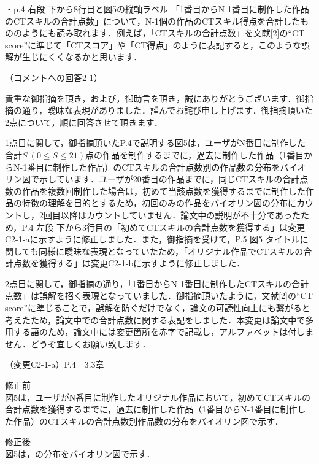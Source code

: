\documentclass{jarticle} %
\def\subsection#1{ \vspace{1pc} {\gt #1} }
\begin{document}
\vspace{0.2cm}
\noindent・p.4 右段 下から8行目と図5の縦軸ラベル 「1番目からN-1番目に制作した作品のCTスキルの合計点数」について，N-1個の作品のCTスキル得点を合計したもののようにも読み取れます．例えば，「CTスキルの合計点数」を文献[2]の``CT score''に準じて「CTスコア」や「CT得点」のように表記すると，このような誤解が生じにくくなるかと思います．

\subsection{（コメントへの回答2-1）}

貴重な御指摘を頂き，および，御助言を頂き，誠にありがとうございます．御指摘の通り，曖昧な表現がありました．謹んでお詫び申し上げます．御指摘頂いた2点について，順に回答させて頂きます．

1点目に関して，御指摘頂いたP.4で説明する図5は，ユーザがN番目に制作した合計{$S~(0 \leq S \leq 21)$}点の作品を制作するまでに，過去に制作した作品（1番目からN-1番目に制作した作品）のCTスキルの合計点数別の作品数の分布をバイオリン図で示しています．ユーザが20番目の作品までに，同じCTスキルの合計点数の作品を複数回制作した場合は，初めて当該点数を獲得するまでに制作した作品の特徴の理解を目的とするため，初回のみの作品をバイオリン図の分布にカウントし，2回目以降はカウントしていません．論文中の説明が不十分であったため，P.4 左段 下から3行目の「初めてCTスキルの合計点数を獲得する」は変更C2-1-aに示すように修正しました．また，御指摘を受けて，P.5 図5 タイトルに関しても同様に曖昧な表現となっていたため，「オリジナル作品でCTスキルの合計点数を獲得する」は変更C2-1-bに示すように修正しました．

2点目に関して，御指摘の通り，「1番目からN-1番目に制作したCTスキルの合計点数」は誤解を招く表現となっていました．御指摘頂いたように，文献[2]の``CT score''に準じることで，誤解を防ぐだけでなく，論文の可読性向上にも繋がると考えたため，論文中での合計点数に関する表記をしました．本変更は論文中で多用する語のため，論文中には変更箇所を赤字で記載し，アルファベットは付しません．どうぞ宜しくお願い致します．


\subsection{（変更C2-1-a）P.4　3.3章}
\vspace{-0.3cm}
\begin{description}
\item 修正前\\
\phantom{　}
図5は，ユーザがN番目に制作したオリジナル作品において，初めてCTスキルの合計点数を獲得するまでに，過去に制作した作品（1番目からN-1番目に制作した作品）のCTスキルの合計点数別作品数の分布をバイオリン図で示す．
\vspace{-0.3cm}
\item 修正後\\
\phantom{　}
図5は，\textcolor{red}{}の分布をバイオリン図で示す．
\end{description}
\end{document}
